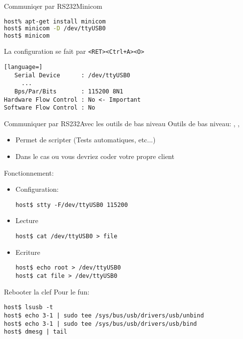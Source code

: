 \begin{frame}[fragile=singleslide]{Communiqer par RS232}{Minicom}
\begin{lstlisting}[language=sh]
host% apt-get install minicom
host$ minicom -D /dev/ttyUSB0
host$ minicom
\end{lstlisting} %
  La configuration se fait par \verb/<RET><Ctrl+A><O>/
\begin{lstlisting}[language=]
   Serial Device      : /dev/ttyUSB0
     ...
   Bps/Par/Bits       : 115200 8N1
Hardware Flow Control : No <- Important
Software Flow Control : No
\end{lstlisting}
\end{frame}


\begin{frame}[fragile=singleslide]{Communiquer par RS232}{Avec les outils de bas niveau}
  Outils de bas niveau: , , 
  \begin{itemize}
  \item Permet de scripter (Tests automatiques, etc...)
  \item Dans le cas ou vous devriez coder votre propre client
  \end{itemize}
  Fonctionnement:
  \begin{itemize}
  \item Configuration:
\begin{lstlisting}
host$ stty -F/dev/ttyUSB0 115200
\end{lstlisting} %
  \item Lecture
\begin{lstlisting}
host$ cat /dev/ttyUSB0 > file
\end{lstlisting} %
  \item Ecriture
\begin{lstlisting}
host$ echo root > /dev/ttyUSB0
host$ cat file > /dev/ttyUSB0
\end{lstlisting} %
  \end{itemize}
\end{frame}

\begin{frame}[fragile=singleslide]{Rebooter la clef}
  Pour le fun:
  \begin{lstlisting}
host$ lsusb -t
host$ echo 3-1 | sudo tee /sys/bus/usb/drivers/usb/unbind
host$ echo 3-1 | sudo tee /sys/bus/usb/drivers/usb/bind
host$ dmesg | tail
  \end{lstlisting} %
\end{frame}

